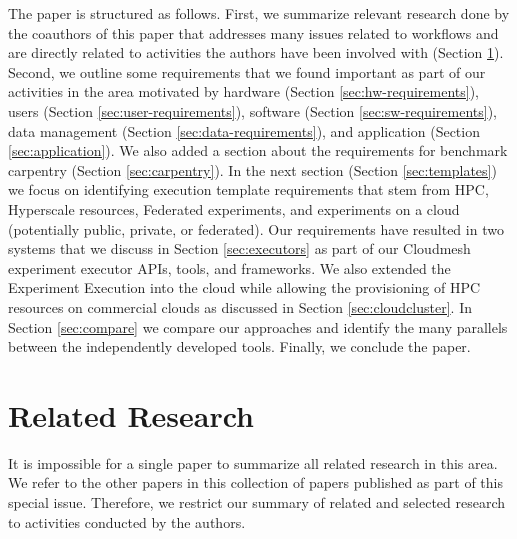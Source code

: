 \documentclass[utf8]{FrontiersinVancouver} %
\begin{document}
The paper is structured as follows. First, we summarize relevant research done by the coauthors of this paper that addresses many issues related to workflows and are directly related to activities the authors have been involved with (Section \ref{sec:related}).
Second, we outline some requirements that we found important as part of our activities in the area motivated by hardware (Section \ref{sec:hw-requirements}), users (Section \ref{sec:user-requirements}), software (Section \ref{sec:sw-requirements}), data management (Section \ref{sec:data-requirements}), and application (Section \ref{sec:application}). We also added a section about the requirements for benchmark carpentry (Section \ref{sec:carpentry}). In the next section (Section \ref{sec:templates}) we focus on identifying execution template requirements that stem from HPC, Hyperscale resources, Federated experiments, and experiments on a cloud (potentially public, private, or federated).
Our requirements have resulted in two systems that we discuss in Section \ref{sec:executors} as part of our Cloudmesh experiment executor APIs, tools, and frameworks.
We also extended the Experiment Execution into the cloud while allowing the provisioning of HPC resources on commercial clouds as discussed in Section \ref{sec:cloudcluster}.
In Section \ref{sec:compare} we compare our approaches and identify the many parallels between the independently developed tools. Finally, we conclude the paper.




\section{Related Research}
\label{sec:related}

It is impossible for a single paper to summarize all related research in this area. We refer to the other papers in this collection of papers published as part of this special issue. Therefore, we restrict our summary of related and selected research to activities conducted by the authors.
\end{document}
